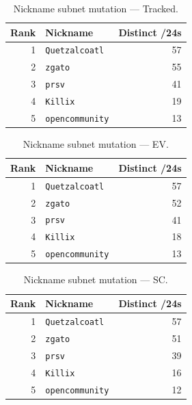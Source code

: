 \documentclass[conference]{IEEEtran}
\begin{document}
\begin{table}[H]
\caption{Nickname subnet mutation --- Tracked.}
\begin{center}\small
\begin{tabular}{|r|l|r|}
\hline
\textbf{Rank} & \textbf{Nickname} & \textbf{Distinct /24s} \\ \hline
1 & \texttt{Quetzalcoatl} & 57 \\ \hline
2 & \texttt{zgato} & 55 \\ \hline
3 & \texttt{prsv} & 41 \\ \hline
4 & \texttt{Killix} & 19 \\ \hline
5 & \texttt{opencommunity} & 13 \\ \hline
\end{tabular}
\label{tab:subnetchg_tracked}
\end{center}\end{table}
 
\begin{table}[H]
\caption{Nickname subnet mutation --- EV.}
\begin{center}\small
\begin{tabular}{|r|l|r|}
\hline
\textbf{Rank} & \textbf{Nickname} & \textbf{Distinct /24s} \\ \hline
1 & \texttt{Quetzalcoatl} & 57 \\ \hline
2 & \texttt{zgato} & 52 \\ \hline
3 & \texttt{prsv} & 41 \\ \hline
4 & \texttt{Killix} & 18 \\ \hline
5 & \texttt{opencommunity} & 13 \\ \hline
\end{tabular}
\label{tab:subnetchg_ephemeral_variable}
\end{center}\end{table}
 
\begin{table}[H]
\caption{Nickname subnet mutation --- SC.}
\begin{center}\small
\begin{tabular}{|r|l|r|}
\hline
\textbf{Rank} & \textbf{Nickname} & \textbf{Distinct /24s} \\ \hline
1 & \texttt{Quetzalcoatl} & 57 \\ \hline
2 & \texttt{zgato} & 51 \\ \hline
3 & \texttt{prsv} & 39 \\ \hline
4 & \texttt{Killix} & 16 \\ \hline
5 & \texttt{opencommunity} & 12 \\ \hline
\end{tabular}
\label{tab:subnetchg_static_control}
\end{center}\end{table}
 
\end{document}
